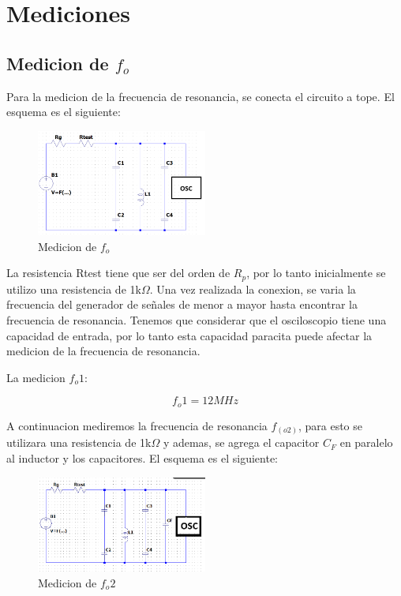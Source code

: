 
\section{Mediciones}

\subsection{Medicion de $f_o$}

Para la medicion de la frecuencia de resonancia, se conecta el circuito a tope. El esquema es el siguiente:

\begin{figure}[h]
    \centering
    \includegraphics[width=0.5\textwidth]{Imagenes/medicion_fo.png}
    \caption{Medicion de $f_o$}
    \label{fig: de la frecuencia de resonancia $f_o$}
\end{figure}

La resistencia Rtest tiene que ser del orden de $R_p$, por lo tanto inicialmente se utilizo una resistencia de 1k$\Omega$. Una vez realizada la conexion, se varia la frecuencia 
del generador de señales de menor a mayor hasta encontrar la frecuencia de resonancia. Tenemos que considerar que el osciloscopio tiene una capacidad de entrada, por lo tanto 
esta capacidad paracita puede afectar la medicion de la frecuencia de resonancia. 


La medicion $f_o1$:

\begin{equation}
    f_o1 = 12 MHz 
\end{equation}


A continuacion mediremos la frecuencia de resonancia $f_(o2)$, para esto se utilizara una resistencia de 1k$\Omega$ y ademas, se agrega el capacitor $C_F$ en paralelo al inductor y los capacitores.
El esquema es el siguiente:

\begin{figure}[h]
    \centering
    \includegraphics[width=0.5\textwidth]{Imagenes/medicion_fo2.png}
    \caption{Medicion de $f_o2$}
    \label{fig: de la frecuencia de resonancia $f_(o2)$}
\end{figure}


